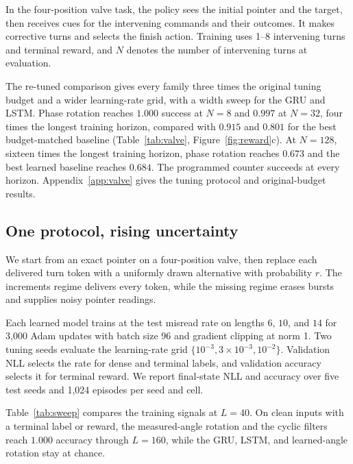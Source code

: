 {}
\label{sec:transfer}
In the four-position valve task, the policy sees the initial pointer and the
target, then receives cues for the intervening commands and their outcomes.
It makes corrective turns and selects the finish action. Training uses
1--8 intervening turns and terminal reward, and $N$ denotes the number of
intervening turns at evaluation.

The re-tuned comparison gives every family three times the original tuning
budget and a wider learning-rate grid, with a width sweep for the GRU and
LSTM. Phase rotation reaches $1.000$ success at $N=8$ and $0.997$ at $N=32$, four
times the longest training horizon, compared with $0.915$ and $0.801$ for
the best budget-matched baseline (Table~\ref{tab:valve}, Figure~\ref{fig:reward}c).
At $N=128$, sixteen times the longest training horizon, phase rotation
reaches $0.673$ and the best learned baseline reaches $0.684$. The
programmed counter succeeds at every horizon. Appendix~\ref{app:valve}
gives the tuning protocol and original-budget results.



\subsection{One protocol, rising uncertainty}
\label{sec:sweep}
We start from an exact pointer on a four-position valve, then replace each
delivered turn token with a uniformly drawn alternative with probability $r$.
The increments regime delivers every token, while the missing regime erases
bursts and supplies noisy pointer readings.

Each learned model trains at the test misread rate on lengths $6$, $10$,
and $14$ for 3{,}000 Adam updates with batch size 96 and gradient clipping
at norm 1. Two tuning seeds evaluate the learning-rate grid
$\{10^{-3},3\times 10^{-3},10^{-2}\}$. Validation NLL selects the rate
for dense and terminal labels, and validation accuracy selects it for
terminal reward. We report final-state NLL and accuracy over five test
seeds and 1{,}024 episodes per seed and cell.

Table~\ref{tab:sweep} compares the training signals at $L=40$. On clean
inputs with a terminal label or reward, the measured-angle rotation and
the cyclic filters reach $1.000$ accuracy through $L=160$, while the GRU,
LSTM, and learned-angle rotation stay at chance.



